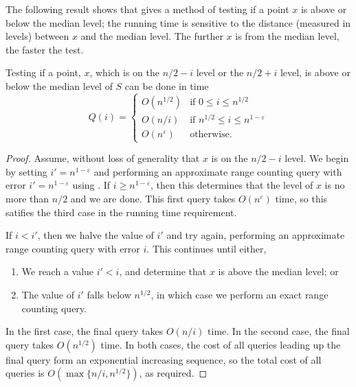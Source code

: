 \documentclass{patmorin}
\newcommand{\eps}{\varepsilon}
\begin{document}
%

The following result shows that  gives a method of
testing if a point $x$ is above or below the median level; the running
time is sensitive to the distance (measured in levels) between $x$ and
the median level.  The further $x$ is from the median level, the faster
the test.

\begin{lem}
  Testing if a point, $x$, which is on the $n/2-i$ level or the $n/2+i$
  level, is above or below the median level of $S$ can be done in time
  \[
       Q(i) = \begin{cases}
          O(n^{1/2}) & \text{if $0\le i \le n^{1/2}$} \\
          O(n/i)      & \text{if $n^{1/2} \le i \le n^{1-\eps}$} \\
          O(n^{\eps}) & \text{otherwise.}
       \end{cases}
  \]
\end{lem}

\begin{proof}
  Assume, without loss of generality that $x$ is on the $n/2-i$
  level.  We begin by setting $i'= n^{1-\eps}$ and performing
  an approximate range counting query with error $i'=n^{1-\eps}$
  using .  If $i \ge n^{1-\eps}$, then this
  determines that the level of $x$ is no more than $n/2$ and we are done.
  This first query takes $O(n^{\eps})$ time, so this satifies the
  third case in the running time requirement.

  If $i < i'$, then we halve the value of $i'$ and try again, performing
  an approximate range counting query with error $i$.  This continues
  until either,
  \begin{enumerate}
    \item We reach a value $i' < i$, and determine that $x$ is above the
      median level; or
    \item The value of $i'$ falls below $n^{1/2}$, in which case we perform
      an exact range counting query.
  \end{enumerate}
  In the first case, the final query takes $O(n/i)$ time. In the second
  case, the final query takes $O(n^{1/2})$ time.  In both cases, the cost
  of all queries leading up the final query form an exponential increasing
  sequence, so the total cost of all queries is $O(\max\{n/i,n^{1/2}\})$,
  as required.
\end{proof}
\end{document}
